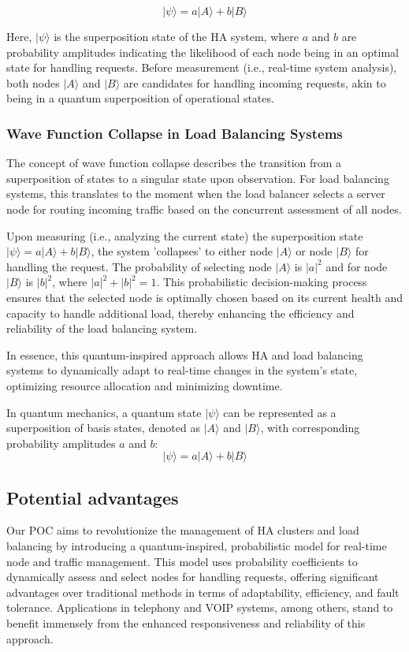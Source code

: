 \documentclass[12pt]{article}
\begin{document}
\[|\psi\rangle = a|A\rangle + b|B\rangle\]

Here, \(|\psi\rangle\) is the superposition state of the HA system, where \(a\) and \(b\) are probability amplitudes indicating the likelihood of each node being in an optimal state for handling requests. Before measurement (i.e., real-time system analysis), both nodes \(|A\rangle\) and \(|B\rangle\) are candidates for handling incoming requests, akin to being in a quantum superposition of operational states.

\subsubsection{Wave Function Collapse in Load Balancing Systems}
The concept of wave function collapse describes the transition from a superposition of states to a singular state upon observation. For load balancing systems, this translates to the moment when the load balancer selects a server node for routing incoming traffic based on the concurrent assessment of all nodes.

Upon measuring (i.e., analyzing the current state) the superposition state \(|\psi\rangle = a|A\rangle + b|B\rangle\), the system 'collapses' to either node \(|A\rangle\) or node \(|B\rangle\) for handling the request. The probability of selecting node \(|A\rangle\) is \(|a|^2\) and for node \(|B\rangle\) is \(|b|^2\), where \(|a|^2 + |b|^2 = 1\). This probabilistic decision-making process ensures that the selected node is optimally chosen based on its current health and capacity to handle additional load, thereby enhancing the efficiency and reliability of the load balancing system.

In essence, this quantum-inspired approach allows HA and load balancing systems to dynamically adapt to real-time changes in the system's state, optimizing resource allocation and minimizing downtime.


In quantum mechanics, a quantum state \(|\psi\rangle\) can be represented as a superposition of basis states, denoted as \(|A\rangle\) and \(|B\rangle\), with corresponding probability amplitudes \(a\) and \(b\):
\[|\psi\rangle = a|A\rangle + b|B\rangle\]


\subsection{Potential advantages}

Our POC aims to revolutionize the management of HA clusters and load balancing by introducing a quantum-inspired, probabilistic model for real-time node and traffic management. This model uses probability coefficients to dynamically assess and select nodes for handling requests, offering significant advantages over traditional methods in terms of adaptability, efficiency, and fault tolerance. Applications in telephony and VOIP systems, among others, stand to benefit immensely from the enhanced responsiveness and reliability of this approach.
\end{document}

